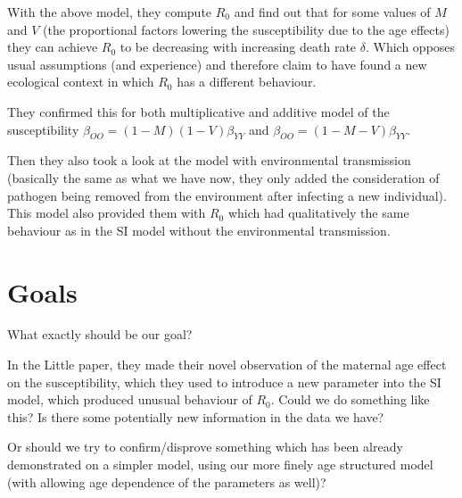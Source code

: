 \documentclass[10pt]{article}         %
\begin{document}
With the above model, they compute $R_0$ and find out that for some values of $M$ and $V$ (the proportional factors lowering the susceptibility due to the age effects) they can achieve $R_0$ to be decreasing with increasing death rate $\delta$. Which opposes usual assumptions (and experience) and therefore claim to have found a new ecological context in which $R_0$ has a different behaviour.\newline

They confirmed this for both multiplicative and additive model of the susceptibility $\beta_{OO}=(1-M)(1-V)\beta_{YY}$ and $\beta_{OO}=(1-M-V)\beta_{YY}$.\newline\newline

Then they also took a look at the model with environmental transmission (basically the same as what we have now, they only added the consideration of pathogen being removed from the environment after infecting a new individual). This model also provided them with $R_0$ which had qualitatively the same behaviour as in the SI model without the environmental transmission.

\section{Goals}

What exactly should be our goal? 

In the Little paper, they made their novel observation of the maternal age effect on the susceptibility, which they used to introduce a new parameter into the SI model, which produced unusual behaviour of $R_0$. Could we do something like this? Is there some potentially new information in the data we have?

Or should we try to confirm/disprove something which has been already demonstrated on a simpler model, using our more finely age structured model (with allowing age dependence of the parameters as well)?



\end{document}
